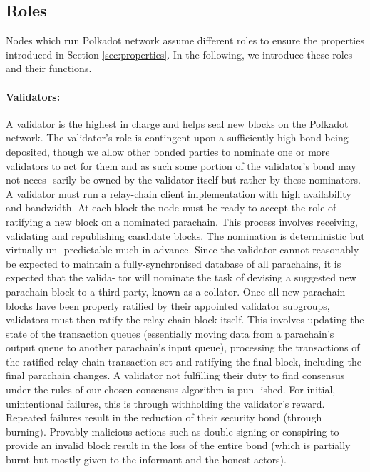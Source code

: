 \subsection{Roles}
Nodes which run Polkadot network assume different roles to ensure the properties introduced in Section \ref{sec:properties}. In the following, we introduce these roles and their functions.

  
\paragraph{Validators:} \label{par:validators} A validator is the highest in charge and helps seal new blocks on the Polkadot network. The validator’s role is contingent upon a sufficiently high bond being deposited, though we allow other bonded parties to nominate one or more validators to act for them and as such some portion of the validator’s bond may not neces- sarily be owned by the validator itself but rather by these nominators.
A validator must run a relay-chain client implementation with high availability and bandwidth. At each block the node must be ready to accept the role of ratifying a new block on a nominated parachain. This process involves receiving, validating and republishing candidate blocks. The nomination is deterministic but virtually un- predictable much in advance. Since the validator cannot reasonably be expected to maintain a fully-synchronised database of all parachains, it is expected that the valida- tor will nominate the task of devising a suggested new parachain block to a third-party, known as a collator.
Once all new parachain blocks have been properly ratified by their appointed validator subgroups, validators must then ratify the relay-chain block itself. This involves updating the state of the transaction queues (essentially moving data from a parachain’s output queue to another parachain’s input queue), processing the transactions of the ratified relay-chain transaction set and ratifying the final block, including the final parachain changes. A validator not fulfilling their duty to find consensus under the rules of our chosen consensus algorithm is pun- ished. For initial, unintentional failures, this is through withholding the validator’s reward. Repeated failures result in the reduction of their security bond (through burning). Provably malicious actions such as double-signing or conspiring to provide an invalid block result in the loss of the entire bond (which is partially burnt but mostly given to the informant and the honest actors).


